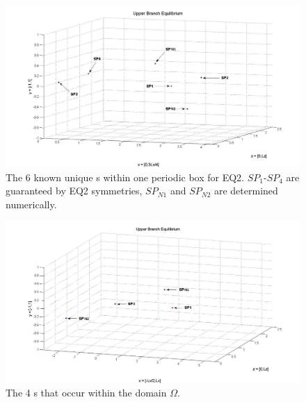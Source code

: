 \documentclass[letter,10pt,openany]{article}
\begin{document}
 \begin{figure}[!h]
\includegraphics[width=1.0\textwidth]{stagps_edited.jpg}
  \caption{
   The 6 known unique \stagp s within one periodic box for EQ2. $SP_1$-$SP_4$ are guaranteed by EQ2 symmetries, $SP_{N1}$ and $SP_{N2}$ are determined numerically. 
   }
  \label{eltonFig:stagps_label}
 \end{figure}

 \begin{figure}[!h]
\includegraphics[width=1.0\textwidth]{stagps2_edited.jpg}
  \caption{
   The 4 \stagp s that occur within the domain $\Omega$.
   }
  \label{eltonFig:stagps_label2}
 \end{figure}
\end{document}
